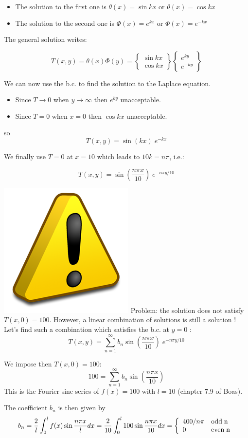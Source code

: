 \begin{itemize}
\item The solution to the first one is $\theta(x)=\sin kx$ or $\theta(x)=\cos kx$
\item The solution to the second one is $\Phi(x)=e^{kx}$ or $\Phi(x)=e^{-kx}$
\end{itemize}


The general solution writes:

\[
T(x,y)=\theta(x) \Phi(y)=
\left\{
\begin{array}{c}
\sin kx \\ \cos kx
\end{array}
\right\}
\left\{
\begin{array}{c}
e^{ky} \\ e^{-ky}
\end{array}
\right\}
\]

We can now use the b.c. to find the solution to the Laplace equation.

\begin{itemize}
\item Since $T\rightarrow 0$ when $y\rightarrow \infty$ then $e^{ky}$ unacceptable.
\item Since $T=0$ when $x=0$ then $\cos kx$ unacceptable.
\end{itemize}

so
\[
T(x,y)=
\sin (kx)  \;
 e^{-kx}
\]

We finally use $T=0$ at $x=10$ which leads to $10k=n \pi$, i.e.:

\[
T(x,y)=\sin (\frac{n\pi x}{10}) \;   e^{-n\pi y/10}
\]

\includegraphics[width=.5cm]{images/benchmark_lapplate/warning.png}
Problem: the solution does not satisfy  $T(x,0)=100$.
However, a linear combination of solutions is still a solution !
Let's find such a combination which satisfies the b.c. at $y=0$ :
\[
T(x,y) = \sum_{n=1}^\infty b_n \sin (\frac{n\pi x}{10}) \;   e^{-n\pi y/10}
\]

We impose then $T(x,0)=100$:
\[
100 = \sum_{n=1}^\infty b_n \sin (\frac{n\pi x}{10}) 
\]
This is the Fourier sine series of $f(x)=100$ with $l=10$ (chapter 7.9 of Boas).

The coefficient $b_n$ is then given by
\[
b_n=\frac{2}{l} \int_0^l f(x) \sin\frac{n \pi x}{l} dx
=\frac{2}{10} \int_0^l 100 \sin\frac{n \pi x}{10} dx
=
\left\{
\begin{array}{ll}
400/n\pi & {\rm odd \; n} \\
0 & {\rm even \; n} \\
\end{array}
\right.
\]

